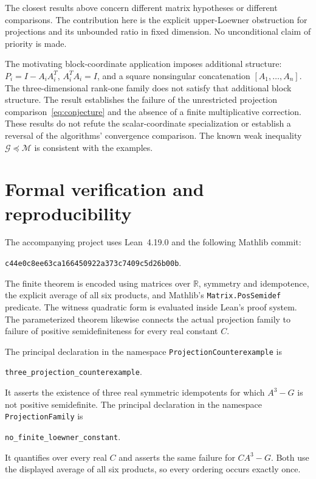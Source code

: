 \documentclass[11pt]{article}
\newcommand{\R}{\mathbb R}
\newcommand{\G}{\mathcal G}
\newcommand{\M}{\mathcal M}
\begin{document}
The closest results above concern different matrix hypotheses or different comparisons. The contribution here is the explicit upper-Loewner obstruction for projections and its unbounded ratio in fixed dimension. No unconditional claim of priority is made.

The motivating block-coordinate application imposes additional structure: $P_i=I-A_iA_i^T$, $A_i^TA_i=I$, and a square nonsingular concatenation $[A_1,\ldots,A_n]$. The three-dimensional rank-one family does not satisfy that additional block structure. The result establishes the failure of the unrestricted projection comparison~\eqref{eq:conjecture} and the absence of a finite multiplicative correction. These results do not refute the scalar-coordinate specialization or establish a reversal of the algorithms' convergence comparison. The known weak inequality $\G\preceq\M$ is consistent with the examples.

\section{Formal verification and reproducibility}\label{sec:formal}

The accompanying project uses Lean~4.19.0 and the following Mathlib commit:
\begin{center}\small\texttt{c44e0c8ee63ca166450922a373c7409c5d26b00b}.\end{center}
The finite theorem is encoded using matrices over $\R$, symmetry and idempotence, the explicit average of all six products, and Mathlib's \texttt{Matrix.PosSemidef} predicate. The witness quadratic form is evaluated inside Lean's proof system. The parameterized theorem likewise connects the actual projection family to failure of positive semidefiniteness for every real constant $C$.

The principal declaration in the namespace \texttt{ProjectionCounterexample} is
\begin{center}\texttt{three\_projection\_counterexample}.\end{center}
It asserts the existence of three real symmetric idempotents for which $A^3-G$ is not positive semidefinite. The principal declaration in the namespace \texttt{ProjectionFamily} is
\begin{center}\texttt{no\_finite\_loewner\_constant}.\end{center}
It quantifies over every real $C$ and asserts the same failure for $CA^3-G$. Both use the displayed average of all six products, so every ordering occurs exactly once.
\end{document}
